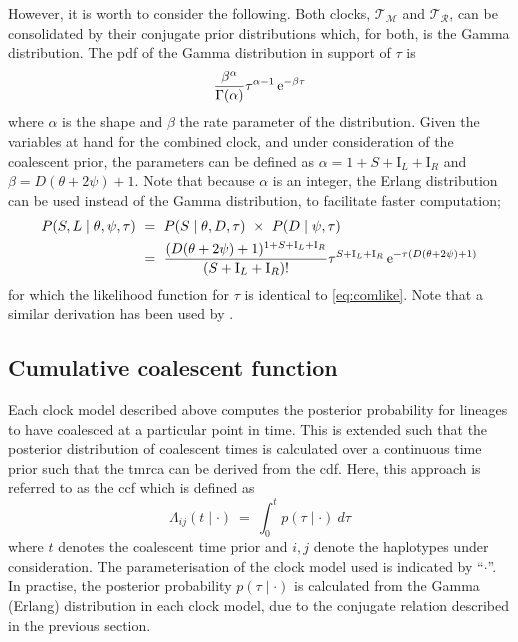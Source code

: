 However, it is worth to consider the following.
Both clocks, $\mathcal{T_{\!\!M}}$ and $\mathcal{T_{\!R}}$, can be consolidated by their conjugate prior distributions which, for both, is the Gamma distribution.
The \gls{pdf} of the Gamma distribution in support of $\tau$ is
\begin{equation*}
	\frac{\beta^\alpha}{\Gamma(\alpha)} \tau^{\alpha - 1} \,\mathrm{e}^{-\beta \tau}
\end{equation*}
where $\alpha$ is the shape and $\beta$ the rate parameter of the distribution.
Given the variables at hand for the combined clock, and under consideration of the coalescent prior, the parameters can be defined as ${\alpha = 1+ S + \mathrm{I}_L + \mathrm{I}_R}$ and ${\beta = D(\theta + 2 \psi) + 1}$.
Note that because $\alpha$ is an integer, the Erlang distribution can be used instead of the Gamma distribution, \eg to facilitate faster computation;
\begin{equation}\label{eq:comgamma}
\begin{split}
	P(S,L \mid \theta,\psi,\tau)
	& ~ = ~ P(S \mid \theta,D,\tau) ~\times~ P(D \mid \psi,\tau) \\
	& ~ = ~ \frac{(D(\theta + 2\psi) + 1)^{1 + S + \mathrm{I}_L + \mathrm{I}_R}}{(S + \mathrm{I}_L + \mathrm{I}_R)!} \tau^{S + \mathrm{I}_L + \mathrm{I}_R} \,\mathrm{e}^{-\tau (D(\theta + 2\psi) + 1)}
\end{split}
\end{equation}
for which the likelihood function for $\tau$ is identical to \cref{eq:comlike}.
Note that a similar derivation has been used by \citet{schroff2016}.


%
\subsection{Cumulative coalescent function}\label{sec:ccf}
%

Each clock model described above computes the posterior probability for  lineages to have coalesced at a particular point in time.
This is extended such that the posterior distribution of coalescent times is calculated over a continuous time prior such that the \gls{tmrca} can be derived from the \gls{cdf}.
Here, this approach is referred to as the \gls{ccf} which is defined as
\begin{equation}
	\Lambda_{ij}(t \mid \cdot) ~=~ \int_{0}^{t} p(\tau\mid\cdot)~d\tau
\end{equation}
where $t$ denotes the coalescent time prior and $i,j$ denote the  haplotypes under consideration.
The parameterisation of the clock model used is indicated by ``$\cdot$''.
In practise, the posterior probability ${p(\tau\mid\cdot)}$ is calculated from the Gamma (Erlang) distribution in each clock model, due to the conjugate relation described in the previous section.



